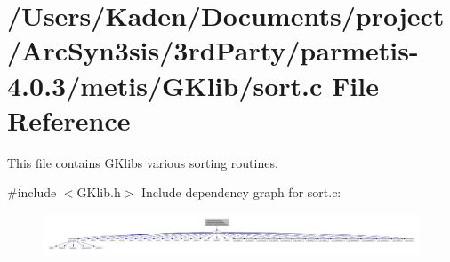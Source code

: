 \hypertarget{a00140}{}\section{/\+Users/\+Kaden/\+Documents/project/\+Arc\+Syn3sis/3rd\+Party/parmetis-\/4.0.3/metis/\+G\+Klib/sort.c File Reference}
\label{a00140}


This file contains G\+Klib\textquotesingle{}s various sorting routines.  


{\ttfamily \#include $<$G\+Klib.\+h$>$}\newline
Include dependency graph for sort.\+c\+:\nopagebreak
\begin{figure}[H]
\begin{center}
\leavevmode
\includegraphics[width=350pt]{a00141}
\end{center}
\end{figure}
